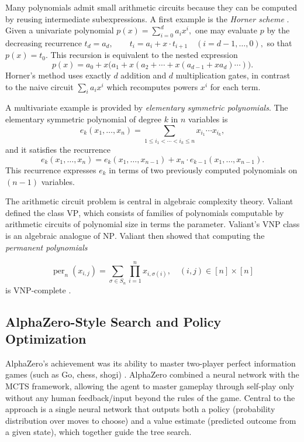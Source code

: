 \documentclass{article} %
\begin{document}
Many polynomials admit small arithmetic circuits because they can be computed by reusing intermediate subexpressions. A first example is the \textit{Horner scheme} \citep{Horner1819NewMethod}. Given a univariate polynomial
\(
p(x)=\sum_{i=0}^{d} a_i x^i,
\)
one may evaluate $p$ by the decreasing recurrence
\(
t_d=a_d,\qquad t_i=a_i + x\cdot t_{i+1}\quad (i=d-1,\dots,0),
\)
so that $p(x)=t_0$. This recursion is equivalent to the nested expression
\[
p(x)=a_0 + x\bigl(a_1 + x( a_2 + \cdots + x(a_{d-1}+x a_d)\cdots )\bigr).
\]
Horner's method uses exactly $d$ addition and $d$ multiplication gates, in contrast to the naive circuit $\sum_i a_i x^i$ which recomputes powers $x^i$ for each term. 

A multivariate example is provided by \textit{elementary symmetric polynomials}. The elementary symmetric polynomial of degree $k$ in $n$ variables is
\[
e_k(x_1,\dots,x_n)=\sum_{1\le i_1<\cdots<i_k\le n} x_{i_1}\cdots x_{i_k},
\]
and it satisfies the recurrence
\[
e_k(x_1,\dots,x_n)=e_k(x_1,\dots,x_{n-1}) + x_n\cdot e_{k-1}(x_1,\dots,x_{n-1}).
\]
This recurrence expresses $e_k$ in terms of two previously computed polynomials on $(n-1)$ variables.

The arithmetic circuit problem is central in algebraic complexity theory. Valiant \citep{Valiant1979CompletenessClasses} defined the class $\mathrm{VP}$, which consists of families of polynomials computable by arithmetic circuits of polynomial size in terms the parameter. Valiant's $\mathrm{VNP}$ class is an algebraic analogue of $\mathrm{NP}$. Valiant then showed that computing the \textit{permanent polynomials}

\[\operatorname{per}_n\left(x_{i,j}\right)=\sum_{\sigma \in S_n} \prod_{i=1}^n x_{i, \sigma(i)}, \quad  (i,j) \in [n] \times [n]\]
is $\mathrm{VNP}$-complete \citep{Valiant1979Permanent}.





\subsection{AlphaZero-Style Search and Policy Optimization}

AlphaZero's achievement was its ability to master two-player perfect information games (such as Go, chess, shogi) \citep{Silveretal2018AlphaZero}. AlphaZero combined a neural network with the MCTS framework, allowing the agent to master gameplay through self-play only without any human feedback/input beyond the rules of the game. Central to the approach is a single neural network that outputs both a policy (probability distribution over moves to choose) and a value estimate (predicted outcome from a given state), which together guide the tree search.
\end{document}
